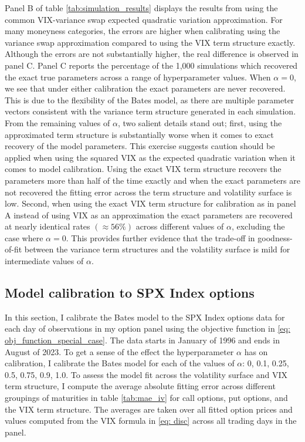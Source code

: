 \documentclass[12pt]{article}
\begin{document}
Panel B of table \ref{tab:simulation_results} displays the results from using the common VIX-variance swap expected quadratic variation approximation. For many moneyness categories, the errors are higher when calibrating using the variance swap approximation compared to using the VIX term structure exactly. Although the errors are not substantially higher, the real difference is observed in panel C. Panel C reports the percentage of the 1,000 simulations which recovered the exact true parameters across a range of hyperparameter values. When $\alpha = 0$, we see that under either calibration the exact parameters are never recovered. This is due to the flexibility of the Bates model, as there are multiple parameter vectors consistent with the variance term structure generated in each simulation. From the remaining values of $\alpha$, two salient details stand out; first, using the approximated term structure is substantially worse when it comes to exact recovery of the model parameters. This exercise suggests caution should be applied when using the squared VIX as the expected quadratic variation when it comes to model calibration. Using the exact VIX term structure recovers the parameters more than half of the time exactly and when the exact parameters are not recovered the fitting error across the term structure and volatility surface is low. Second, when using the exact VIX term structure for calibration as in panel A instead of using VIX as an approximation the exact parameters are recovered at nearly identical rates $(\approx 56\%)$ across different values of $\alpha$, excluding the case where $\alpha = 0$. This provides further evidence that the trade-off in goodness-of-fit between the variance term structures and the volatility surface is mild for intermediate values of $\alpha$. 



\subsection{Model calibration to SPX Index options}\label{subsec: SPX_fit}
In this section, I calibrate the Bates model to the SPX Index options data for each day of observations in my option panel using the objective function in \eqref{eq: obj_function_special_case}. The data starts in January of 1996 and ends in August of 2023. To get a sense of the effect the hyperparameter $\alpha$ has on calibration, I calibrate the Bates model for each of the values of $\alpha$: 0, 0.1, 0.25, 0.5, 0.75, 0.9, 1.0. To assess the model fit across the volatility surface and VIX term structure, I compute the average absolute fitting error across different groupings of maturities in table \ref{tab:mae_iv} for call options, put options, and the VIX term structure. The averages are taken over all fitted option prices and values computed from the VIX formula in \eqref{eq: disc} across all trading days in the panel.
\end{document}
